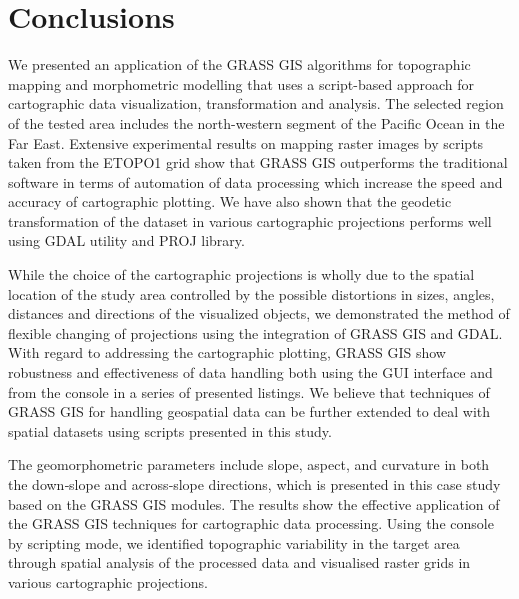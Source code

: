\documentclass[technologies,article,submit,pdftex,moreauthors]{Definitions/mdpi}
\begin{document}
\section{Conclusions}

We presented an application of the GRASS GIS algorithms for topographic mapping and morphometric modelling that uses a script-based approach for cartographic data visualization, transformation and analysis. The selected region of the tested area includes the north-western segment of the Pacific Ocean in the Far East. Extensive experimental results on mapping raster images by scripts taken from the ETOPO1 grid show that GRASS GIS outperforms the traditional software in terms of automation of data processing which increase the speed and accuracy of cartographic plotting. We have also shown that the geodetic transformation of the dataset in various cartographic projections performs well using GDAL utility and PROJ library. 

While the choice of the cartographic projections is wholly due to the spatial location of the study area controlled by the possible distortions in sizes, angles, distances and directions of the visualized objects, we demonstrated the method of flexible changing of projections using the integration of GRASS GIS and GDAL. With regard to addressing the cartographic plotting, GRASS GIS show robustness and effectiveness of data handling both using the GUI interface and from the console in a series of presented listings. We believe that techniques of GRASS GIS for handling geospatial data can be further extended to deal with spatial datasets using scripts presented in this study.

The geomorphometric parameters include slope, aspect, and curvature in both the down‐slope and across‐slope directions, which is presented in this case study based on the GRASS GIS modules. The results show the effective application of the GRASS GIS techniques for cartographic data processing. Using the console by scripting mode, we identified topographic variability in the target area through spatial analysis of the processed data and visualised raster grids in various cartographic projections. 

\end{document}

